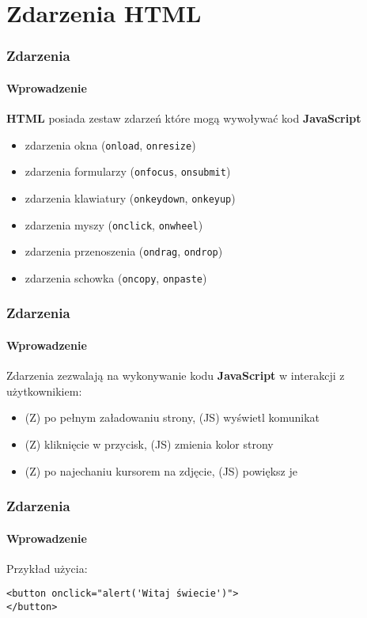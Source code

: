\section{Zdarzenia HTML}

\begin{frame}[fragile]
  \frametitle{Zdarzenia}
  \framesubtitle{Wprowadzenie}

  \textbf{HTML} posiada zestaw zdarzeń które mogą wywoływać kod \textbf{JavaScript}

  \begin{itemize}
    \item zdarzenia okna (\verb|onload|, \verb|onresize|)
    \item zdarzenia formularzy (\verb|onfocus|, \verb|onsubmit|)
    \item zdarzenia klawiatury (\verb|onkeydown|, \verb|onkeyup|)
    \item zdarzenia myszy (\verb|onclick|, \verb|onwheel|)
    \item zdarzenia przenoszenia (\verb|ondrag|, \verb|ondrop|)
    \item zdarzenia schowka (\verb|oncopy|, \verb|onpaste|)
  \end{itemize}

\end{frame}


\begin{frame}[fragile]
  \frametitle{Zdarzenia}
  \framesubtitle{Wprowadzenie}

  Zdarzenia zezwalają na wykonywanie kodu \textbf{JavaScript} w interakcji z użytkownikiem:

  \begin{itemize}
    \item (Z) po pełnym załadowaniu strony, (JS) wyświetl komunikat
    \item (Z) kliknięcie w przycisk, (JS) zmienia kolor strony
    \item (Z) po najechaniu kursorem na zdjęcie, (JS) powiększ je
  \end{itemize}
\end{frame}


\begin{frame}[fragile]
  \frametitle{Zdarzenia}
  \framesubtitle{Wprowadzenie}

  Przykład użycia:

  \begin{verbatim}
<button onclick="alert('Witaj świecie')">
</button>
  \end{verbatim}

\end{frame}

